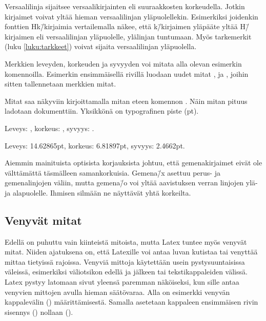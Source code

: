 Versaalilinja sijaitsee versaalikirjainten eli suuraakkosten
korkeudella. Jotkin kirjaimet voivat yltää hieman versaalilinjan
yläpuolellekin. Esimerkiksi joidenkin fonttien Hk\=/kirjaimia
vertailemalla näkee, että k\=/kirjaimen yläpääte yltää H\=/kirjaimen eli
versaalilinjan yläpuolelle, ylälinjan tuntumaan. Myös tarkemerkit (luku
\ref{luku:tarkkeet}) voivat sijaita versaalilinjan yläpuolella.


Merkkien leveyden, korkeuden ja syvyyden voi mitata alla olevan
esimerkin komennoilla. Esimerkin ensimmäisellä rivillä luodaan uudet
mitat ,  ja , joihin sitten tallennetaan merkkien mitat.

\begin{koodilohkosis}
  \newlength{\leveys} \newlength{\korkeus} \newlength{\syvyys}
  \settowidth{\leveys}{abc} %
\end{koodilohkosis}


Mitat saa näkyviin kirjoittamalla mitan eteen komennon . Näin mitan pituus ladotaan dokumenttiin. Yksikkönä on
typografinen piste (pt).

\begin{koodilohkosis}
  Leveys: \the\leveys, korkeus: \the\korkeus, syvyys: \the\syvyys.
\end{koodilohkosis}

\begin{tulossis}
  Leveys: 14.62865pt, korkeus: 6.81897pt, syvyys: 2.4662pt.
\end{tulossis}

Aiemmin mainituista optisista korjauksista johtuu, että gemenakirjaimet
eivät ole välttämättä täsmälleen samankorkuisia. Gemena\=/x asettuu
perus- ja gemenalinjojen väliin, mutta gemena\=/o voi yltää aavistuksen
verran linjojen ylä- ja alapuolelle. Ihmisen silmään ne näyttävät yhtä
korkeilta.

\subsection{Venyvät mitat}

Edellä on puhuttu vain kiinteistä mitoista, mutta Latex tuntee myös
venyvät mitat. Niiden ajatuksena on, että Latexille voi antaa luvan
kutistaa tai venyttää mittaa tietyissä rajoissa. Venyviä mittoja
käytettään usein pystysuuntaisissa väleissä, esimerkiksi väliotsikon
edellä ja jälkeen tai tekstikappaleiden välissä. Latex pystyy latomaan
sivut yleensä paremman näköiseksi, kun sille antaa venyvien mittojen
avulla hieman säätövaraa. Alla on esimerkki venyvän kappalevälin
() määrittämisestä. Samalla asetetaan kappaleen
ensimmäisen rivin sisennys () nollaan
(\koodi{0em}).

